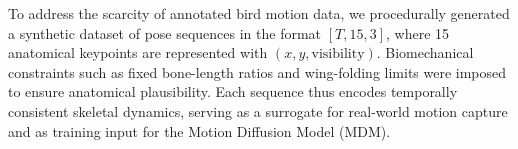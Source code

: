 \documentclass[final-report]{report-template}
\begin{document}


To address the scarcity of annotated bird motion data, we procedurally generated a synthetic dataset of pose sequences in the format $[T, 15, 3]$, where 15 anatomical keypoints are represented with $(x, y, \text{visibility})$. Biomechanical constraints such as fixed bone-length ratios and wing-folding limits were imposed to ensure anatomical plausibility. Each sequence thus encodes temporally consistent skeletal dynamics, serving as a surrogate for real-world motion capture and as training input for the Motion Diffusion Model (MDM).  
\end{document}
